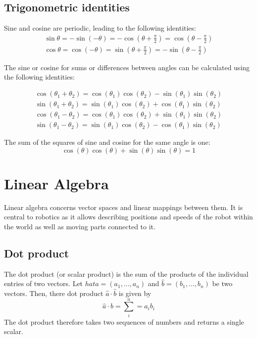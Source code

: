 \documentclass[paper=6.14in:9.21in,pagesize=pdftex,11pt,twoside,openright]{scrbook}
\begin{document}
\section{Trigonometric identities}
Sine and cosine are periodic, leading to the following identities:
\begin{eqnarray}
\sin\theta=-\sin(-\theta)=-\cos(\theta+\frac{\pi}{2})=\cos(\theta-\frac{\pi}{2})\\
\cos\theta=\cos(-\theta)=\sin(\theta+\frac{\pi}{2})=-\sin(\theta-\frac{\pi}{2})
\end{eqnarray}

The sine or cosine for sums or differences between angles can be calculated using the following identities:

\begin{eqnarray}
\cos(\theta_1+\theta_2)=\cos(\theta_1)\cos(\theta_2)-\sin(\theta_1)\sin(\theta_2)\\
\sin(\theta_1+\theta_2)=\sin(\theta_1)\cos(\theta_2)+\cos(\theta_1)\sin(\theta_2)\\
\cos(\theta_1-\theta_2)=\cos(\theta_1)\cos(\theta_2)+\sin(\theta_1)\sin(\theta_2)\\
\sin(\theta_1-\theta_2)=\sin(\theta_1)\cos(\theta_2)-\cos(\theta_1)\sin(\theta_2)
\end{eqnarray}

The sum of the squares of sine and cosine for the same angle is one:
\begin{equation}
\cos(\theta)\cos(\theta)+\sin(\theta)\sin(\theta)=1
\end{equation}

\chapter{Linear Algebra}
Linear algebra concerns vector spaces and linear mappings between them. It is central to robotics as it allows describing positions and speeds of the robot within the world as well as moving parts connected to it. 

\section{Dot product}
The dot product (or scalar product) is the sum of the products of the individual entries of two vectors. Let $hat{a}=(a_1,\ldots,a_n)$ and $\hat{b}=(b_1,\ldots,b_n)$ be two vectors. Then, there dot product $\hat{a}\cdot\hat{b}$ is given by
\begin{equation}
\hat{a}\cdot\hat{b}=\sum_{i}^n=a_ib_i
\end{equation}
The dot product therefore takes two sequences of numbers and returns a single scalar. 
\end{document}
